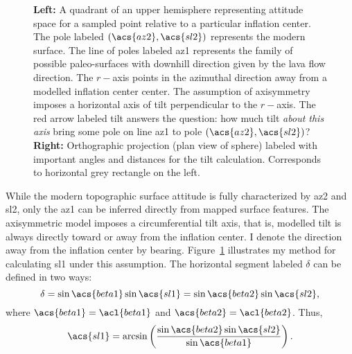 \begin{figure}
\begin{center}
    \hspace{1cm}%
    \caption[\Acl{tilt} from mapping]{\textbf{Left:} A quadrant of an upper hemisphere representing attitude space for a sampled point relative to a particular inflation center. The pole labeled $\left(\acs{az2},\acs{sl2}\right)$ represents the modern surface. The line of poles labeled \acs{az1} represents the family of possible paleo-surfaces with downhill direction given by the lava flow direction. The $r-$axis points in the azimuthal direction away from a modelled inflation center \acs{center}. The assumption of axisymmetry imposes a horizontal axis of tilt perpendicular to the $r-$axis. The red arrow labeled \acs{tilt} answers the question: how much tilt \emph{about this axis} bring some pole on line \acs{az1} to pole $\left(\acs{az2},\acs{sl2}\right)$? \textbf{Right:} Orthographic projection (plan view of sphere) labeled with important angles and distances for the tilt calculation. Corresponds to horizontal grey rectangle on the left.}%
    \label{fig:tilt-from-map}%
\end{center}
\end{figure}
While the modern topographic surface attitude is fully characterized by \acs{az2} and \acs{sl2}, only the \acf{az1} can be inferred directly from mapped surface features. The axisymmetric model imposes a circumferential tilt axis, that is, modelled tilt is always directly toward or away from the inflation center. I denote the direction away from the inflation center by \acs{bearing}. Figure~\ref{fig:tilt-from-map} illustrates my method for calculating \acf{sl1} under this assumption. The horizontal segment labeled $\delta$ can be defined in two ways:
\begin{equation*}
    \delta = \sin\acs{beta1}\sin\acs{sl1} = \sin\acs{beta2}\sin\acs{sl2},
\end{equation*}
where $\acs{beta1} = \acl{beta1}$ and $\acs{beta2} = \acl{beta2}$. Thus,
\begin{equation}
    \acs{sl1} = \arcsin\left(\frac{\sin\acs{beta2}\sin\acs{sl2}}{\sin\acs{beta1}}\right).\label{eq:sl1}
\end{equation}
